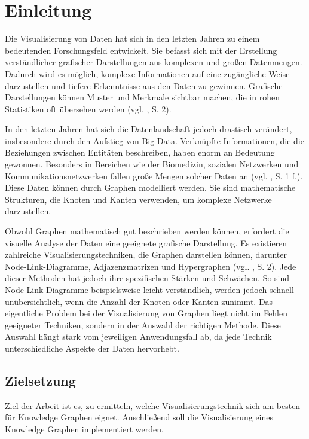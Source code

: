 
\chapter{Einleitung}

Die Visualisierung von Daten hat sich in den letzten Jahren zu einem bedeutenden Forschungsfeld entwickelt. Sie befasst sich mit der Erstellung verständlicher grafischer Darstellungen aus komplexen und großen Datenmengen. Dadurch wird es möglich, komplexe Informationen auf eine zugängliche Weise darzustellen und tiefere Erkenntnisse aus den Daten zu gewinnen. Grafische Darstellungen können Muster und Merkmale sichtbar machen, die in rohen Statistiken oft übersehen werden (vgl. \cite{unwin:WhyDataVisualization}, S. 2).

In den letzten Jahren hat sich die Datenlandschaft jedoch drastisch verändert, insbesondere durch den Aufstieg von Big Data. Verknüpfte Informationen, die die Beziehungen zwischen Entitäten beschreiben, haben enorm an Bedeutung gewonnen. Besonders in Bereichen wie der Biomedizin, sozialen Netzwerken und Kommunikationsnetzwerken fallen große Mengen solcher Daten an (vgl. \cite{chen:SurveyGraphVisualization}, S. 1 f.). Diese Daten können durch Graphen modelliert werden. Sie sind mathematische Strukturen, die Knoten und Kanten verwenden, um komplexe Netzwerke darzustellen.

Obwohl Graphen mathematisch gut beschrieben werden können, erfordert die visuelle Analyse der Daten eine geeignete grafische Darstellung. Es existieren zahlreiche Visualisierungstechniken, die Graphen darstellen können, darunter Node-Link-Diagramme, Adjazenzmatrizen und Hypergraphen (vgl. \cite{chen:SurveyGraphVisualization}, S. 2). Jede dieser Methoden hat jedoch ihre spezifischen Stärken und Schwächen. So sind Node-Link-Diagramme beispielsweise leicht verständlich, werden jedoch schnell unübersichtlich, wenn die Anzahl der Knoten oder Kanten zunimmt. Das eigentliche Problem bei der Visualisierung von Graphen liegt nicht im Fehlen geeigneter Techniken, sondern in der Auswahl der richtigen Methode. Diese Auswahl hängt stark vom jeweiligen Anwendungsfall ab, da jede Technik unterschiedliche Aspekte der Daten hervorhebt.

\section{Zielsetzung}

Ziel der Arbeit ist es, zu ermitteln, welche Visualisierungstechnik sich am besten für Knowledge Graphen eignet. Anschließend soll die Visualisierung eines Knowledge Graphen implementiert werden.

